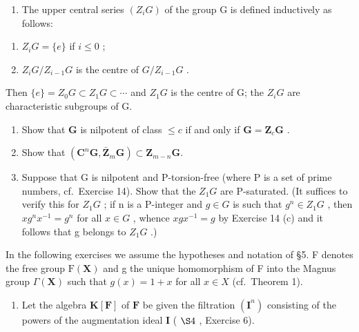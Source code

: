 \begin{enumerate}
\def\labelenumi{\arabic{enumi}.}
\setcounter{enumi}{17}
\tightlist
\item
  The upper central series \((Z_{i}G)\) of the group G is defined inductively as follows:
\end{enumerate}

\begin{enumerate}
\def\labelenumi{(\roman{enumi})}
\item
  \(Z_{i}G = \{e\}\) if \(i \leqslant 0\) ;
\item
  \(Z_{i}G/Z_{i-1}G\) is the centre of \(G/Z_{i-1}G\) .
\end{enumerate}

Then \(\{e\} = Z_0G \subset Z_1G \subset \cdots\) and \(Z_1G\) is the centre of G; the \(Z_iG\) are characteristic subgroups of G.

\begin{enumerate}
\def\labelenumi{(\alph{enumi})}
\item
  Show that \(\mathbf{G}\) is nilpotent of class \(\leqslant c\) if and only if \(\mathbf{G} = \mathbf{Z}_c\mathbf{G}\) .
\item
  Show that \((\mathbf{C}^n\mathbf{G},\bar{\mathbf{Z}}_m\mathbf{G})\subset \mathbf{Z}_{m - n}\mathbf{G}.\)
\item
  Suppose that G is nilpotent and P-torsion-free (where P is a set of prime numbers, cf.~Exercise 14). Show that the \(Z_{1}G\) are P-saturated. (It suffices to verify this for \(Z_{1}G\) ; if n is a P-integer and \(g \in G\) is such that \(g^{n} \in Z_{1}G\) , then \(xg^{n}x^{-1} = g^{n}\) for all \(x \in G\) , whence \(xgx^{-1} = g\) by Exercise 14 (c) and it follows that g belongs to \(Z_{1}G\) .)
\end{enumerate}


In the following exercises we assume the hypotheses and notation of §5. F denotes the free group \(\mathrm{F}(\mathbf{X})\) and g the unique homomorphism of F into the Magnus group \(\Gamma(\mathbf{X})\) such that \(g(x)=1+x\) for all \(x\in X\) (cf.~Theorem 1).

\begin{enumerate}
\def\labelenumi{\arabic{enumi}.}
\tightlist
\item
  Let the algebra \(\mathbf{K}[\mathbf{F}]\) of \(\mathbf{F}\) be given the filtration \((\mathbf{I}^n)\) consisting of the powers of the augmentation ideal \(\mathbf{I}\) ( \(\S 4\) , Exercise 6).
\end{enumerate}

